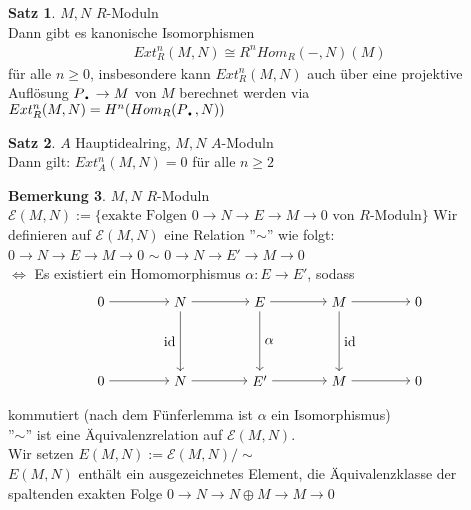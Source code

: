 \documentclass[10pt,a4paper,numbers=endperiod]{scrreprt}
\theoremstyle{definition}
\newtheorem{satz}{Satz}[section]
\newtheorem{bem}[satz]{Bemerkung}
\newcommand{\point}{\text{\textbullet}}
\begin{document}
\begin{satz}
	$M, N$ $R$-Moduln\\
	Dann gibt es kanonische Isomorphismen \begin{align*}
		Ext_R^n(M, N) \cong R^n Hom_R(-,N)(M)
	\end{align*}
	für alle $n \geq 0$, insbesondere kann $Ext_R^n (M, N)$ auch über eine projektive Auflösung $P_\point \to M$ von $M$ berechnet werden via $Ext_R^n(M, N) = H^n (Hom_R(P_\point, N))$
\end{satz}

\begin{satz}
	$A$ Hauptidealring, $M, N$ $A$-Moduln\\
	Dann gilt: $Ext_A^n (M, N) = 0$ für alle $n \geq 2$
\end{satz}

\begin{bem}
	$M, N$ $R$-Moduln\\
	$\mathcal{E} (M, N) := \{\text{exakte Folgen } 0 \to N \to E \to M \to 0 \text{ von $R$-Moduln}\}$
	Wir definieren auf $\mathcal{E}(M, N)$ eine Relation ''$\sim$'' wie folgt:\\
	$0 \to N \to E \to M \to 0$ $\sim$ $0 \to N \to E' \to M \to 0$\\
	$\Leftrightarrow$ Es existiert ein Homomorphismus $\alpha: E \to E'$, sodass \begin{align*}
	\begin{tikzpicture}{
		\node (30) at (1,2) {$0$};
		\node (31) at (3,2) {$ N $};
		\node (32) at (5,2) {$ E $};
		\node (33) at (7,2) {$ M $};
		\node (34) at (9,2) {$ 0 $};
		\node (40) at (1,0) {$ 0 $};
		\node (41) at (3,0) {$ N $};
		\node (42) at (5,0) {$ E' $};
		\node (43) at (7,0) {$ M $};
		\node (44) at (9,0) {$ 0 $};
		\draw[->] (30) edge (31);
		\draw[->] (31) edge (32);
		\draw[->] (32) edge (33);
		\draw[->] (33) edge (34);
		\draw[->] (40) edge (41);
		\draw[->] (41) edge (42);
		\draw[->] (42) edge (43);
		\draw[->] (43) edge (44);
		\draw[->] (31) edge node[left] {id} (41);
		\draw[->] (32) edge node[right] {$\alpha$} (42);
		\draw[->] (33) edge node[right] {id} (43);}
	\end{tikzpicture}
	\end{align*}
	kommutiert (nach dem Fünferlemma ist $\alpha$ ein Isomorphismus)\\
	''$\sim$'' ist eine Äquivalenzrelation  auf $\mathcal{E}(M, N)$.\\
	Wir setzen $E(M, N) := \mathcal{E}(M,N)/\sim$\\
	$E(M,N)$ enthält ein ausgezeichnetes Element, die Äquivalenzklasse der spaltenden exakten Folge $0 \to N \to N \oplus M \to M \to 0$
\end{bem}
\end{document}
